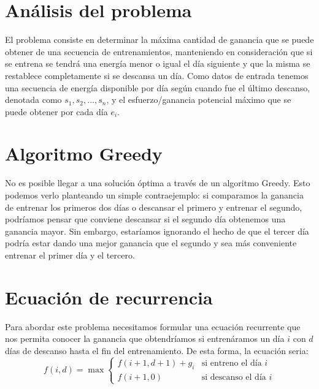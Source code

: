 \documentclass{estilo}
\begin{document}
\maketitle

\justifying{
}

% 
\newpage

\section{Análisis del problema}

El problema consiste en determinar la máxima cantidad de ganancia que se puede obtener de una secuencia de entrenamientos, manteniendo en consideración que si se entrena se tendrá una energía menor o igual el día siguiente y que la misma se restablece completamente si se descansa un día. Como datos de entrada tenemos una secuencia de energía disponible por día según cuando fue el último descanso, denotada como $s_1, s_2, ..., s_n$, y el esfuerzo/ganancia potencial máximo que se puede obtener por cada día $e_i$.

\section{Algoritmo Greedy}

No es posible llegar a una solución óptima a través de un algoritmo Greedy. Esto podemos verlo planteando un simple contraejemplo: si comparamos la ganancia de entrenar los primeros dos días o descansar el primero y entrenar el segundo, podríamos pensar que conviene descansar si el segundo día obtenemos una ganancia mayor. Sin embargo, estaríamos ignorando el hecho de que el tercer día podría estar dando una mejor ganancia que el segundo y sea más conveniente entrenar el primer día y el tercero.

\section{Ecuación de recurrencia}
Para abordar este problema necesitamos formular una ecuación recurrente que nos permita conocer la ganancia que obtendríamos si entrenáramos un día $i$ con $d$ días de descanso hasta el fin del entrenamiento. De esta forma, la ecuación seria:
\[f(i, d) = \max\left\{
\begin{array}{ll}
f(i+1, d+1) + g_i & \text{si entreno el día } i \\
f(i+1, 0) & \text{si descanso el día } i
\end{array}
\right.
\]
\end{document}
